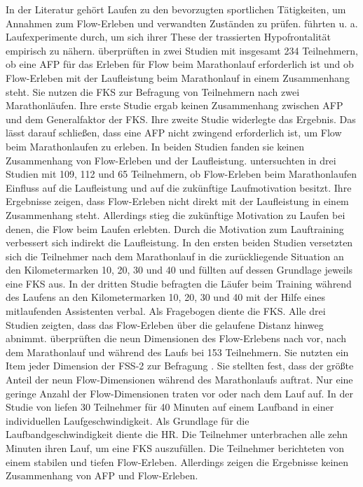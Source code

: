 In der Literatur gehört Laufen zu den bevorzugten sportlichen Tätigkeiten, um Annahmen zum Flow-Erleben und verwandten Zuständen zu prüfen. \citet{Dietrich2004a} führten u. a. Laufexperimente durch, um sich ihrer These der trassierten Hypofrontalität empirisch zu nähern. \citet{Stoll2005} überprüften in zwei Studien mit insgesamt 234 Teilnehmern, ob eine \ac{AFP} für das Erleben für Flow beim Marathonlauf erforderlich ist und ob Flow-Erleben mit der Laufleistung beim Marathonlauf in einem Zusammenhang steht. Sie nutzen die \ac{FKS} zur Befragung von Teilnehmern nach zwei Marathonläufen. Ihre erste Studie ergab keinen Zusammenhang zwischen \ac{AFP} und dem Generalfaktor der \ac{FKS}. Ihre zweite Studie widerlegte das Ergebnis. Das lässt \citet{Stoll2005} darauf schließen, dass eine \ac{AFP} nicht zwingend erforderlich ist, um Flow beim Marathonlaufen zu erleben. In beiden Studien fanden sie keinen Zusammenhang von Flow-Erleben und der Laufleistung. \citet{Schuler2009} untersuchten in drei Studien mit 109, 112 und 65 Teilnehmern, ob Flow-Erleben beim Marathonlaufen Einfluss auf die Laufleistung und auf die zukünftige Laufmotivation besitzt. Ihre Ergebnisse zeigen, dass Flow-Erleben nicht direkt mit der Laufleistung in einem Zusammenhang steht. Allerdings stieg die zukünftige Motivation zu Laufen bei denen, die Flow beim Laufen erlebten. Durch die Motivation zum Lauftraining verbessert sich indirekt die Laufleistung. In den ersten beiden Studien versetzten sich die Teilnehmer nach dem Marathonlauf in die zurückliegende Situation an den Kilometermarken 10, 20, 30 und 40 und füllten auf dessen Grundlage jeweils eine \ac{FKS} aus. In der dritten Studie befragten \citet{Schuler2009} die Läufer beim Training während des Laufens an den Kilometermarken 10, 20, 30 und 40 mit der Hilfe eines mitlaufenden Assistenten verbal. Als Fragebogen diente die \ac{FKS}. Alle drei Studien zeigten, dass das Flow-Erleben über die gelaufene Distanz hinweg abnimmt. \citet{Jimenez-Torres2013} überprüften die neun Dimensionen des Flow-Erlebens nach \citet{Csikszentmihalyi1992} vor, nach dem Marathonlauf und während des Laufs bei 153 Teilnehmern. Sie nutzten ein Item jeder Dimension der FSS-2 zur Befragung \citet{Jackson2002}. Sie stellten fest, dass der größte Anteil der neun Flow-Dimensionen während des Marathonlaufs auftrat. Nur eine geringe Anzahl der Flow-Dimensionen traten vor oder nach dem Lauf auf. In der Studie von \citet{Reinhardt2006} liefen 30 Teilnehmer für 40 Minuten auf einem Laufband in einer individuellen Laufgeschwindigkeit. Als Grundlage für die Laufbandgeschwindigkeit diente die \ac{HR}. Die Teilnehmer unterbrachen alle zehn Minuten ihren Lauf, um eine \ac{FKS} auszufüllen. Die Teilnehmer berichteten von einem stabilen und tiefen Flow-Erleben. Allerdings zeigen die Ergebnisse keinen Zusammenhang von \ac{AFP} und Flow-Erleben.

